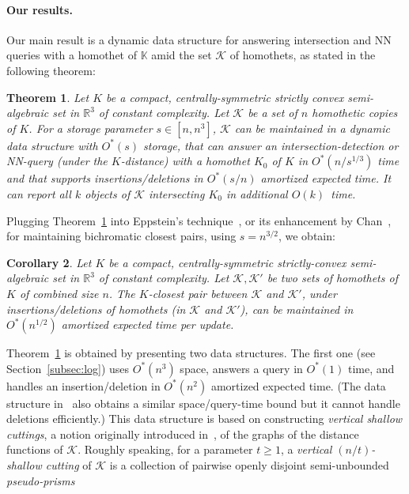 \documentclass[11pt]{article}
\def\reals{{\mathbb R}}
\def\Kspace{{\mathbb K}}
\def\K{\mathcal{K}}
\newtheorem{theorem}{Theorem}[section]
\newtheorem{corollary}[theorem]{Corollary}
\theoremstyle{definition}
\begin{document}
\paragraph{Our results.} 
Our main result is a dynamic data structure for answering intersection 
and NN queries with a homothet of $\Kspace$ amid the set $\K$ of homothets, as stated in the following theorem:
\fi
%
\begin{theorem} \label{thm:NN}
Let $K$ be a compact, centrally-symmetric strictly convex semi-algebraic set
in $\reals^3$ of constant complexity.  Let $\K$ be a set of $n$ homothetic 
copies of $K$. For a storage parameter $s \in [n,n^3]$, $\K$ can be maintained in a dynamic data 
	structure with $O^*(s)$ storage, that can answer an intersection-detection or NN-query (under the $K$-distance) 
	with a homothet $K_0$ of $K$ 
	in $O^*(n/s^{1/3})$ time and that supports insertions/deletions in $O^*(s/n)$ 
	amortized expected time. It can report all $k$ objects of $\K$ intersecting $K_0$ in additional $O(k)$~time.
\end{theorem}
Plugging Theorem~\ref{thm:NN} into Eppstein's technique~\cite{Epp}, or its enhancement by Chan~\cite{Chan:bcp},
for maintaining bichromatic closest pairs, using $s=n^{3/2}$, we obtain:
\begin{corollary}
	\label{cor:bcp}
Let $K$ be a compact, centrally-symmetric strictly-convex semi-algebraic set
in $\reals^3$ of constant complexity. Let $\K, \K'$ be two sets of homothets of $K$
of combined size $n$. The $K$-closest pair between $\K$ and $\K'$,
under insertions/deletions of homothets (in $\K$ and $\K'$), can be 
maintained in $O^*(n^{1/2})$ amortized expected time per update.
\end{corollary}
%
Theorem~\ref{thm:NN} is obtained by presenting two data structures. The first 
one (see Section~\ref{subsec:log})
uses $O^*(n^3)$ space, answers a query in $O^*(1)$ time, and handles an insertion/deletion in $O^*(n^2)$ amortized expected time. 
(The data structure in~\cite{AES:vd} also obtains a similar space/query-time bound but it cannot handle deletions efficiently.)
This data structure is based on constructing \emph{vertical shallow cuttings}, a notion originally introduced in~\cite{CT16,Chan:le},  of the graphs of the distance functions of $\K$. Roughly speaking,
for a parameter $t\ge 1$, a \emph{vertical $(n/t)$-shallow 
cutting} of $\K$ is a collection of pairwise openly disjoint semi-unbounded \emph{pseudo-prisms} 
\end{document}
